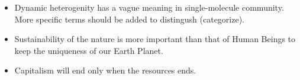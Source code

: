 \begin{itemize}
	\item Dynamic heterogenity has a vague meaning in single-molecule community. More specific terms should be added to distingush (categorize).
	\item Sustainability of the nature is more important than that of Human Beings to keep the uniqueness of our Earth Planet.
	\item Capitalism will end only when the resources ends.
\end{itemize}